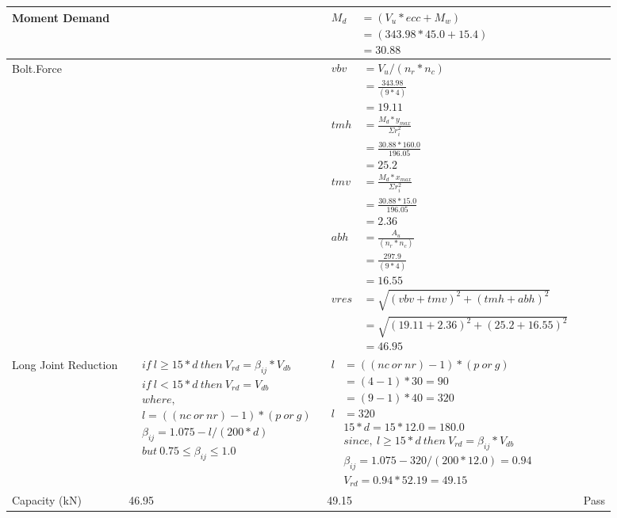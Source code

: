 \documentclass{article}%
\begin{document}
\begin{longtable}{|p{4cm}|p{5cm}|p{6.5cm}|p{1.5cm}|}
\hline%
Moment Demand&&$\begin{aligned}  M_d~~ &= (V_u * ecc + M_w)\\  &= (343.98 * 45.0 + 15.4)\\  & =30.88\end{aligned}$&\\%
\hline%
Bolt.Force&&$\begin{aligned} vbv~~ &= V_u / (n_r * n_c)\\  &= \frac{343.98}{ (9*4)}\\  & =19.11\\ tmh~ &= \frac{M_d * y_{max} }{ \Sigma r_i^2} \\  &= \frac{30.88 *160.0}{196.05}\\  & =25.2\\  tmv ~&= \frac{M_d * x_{max}}{\Sigma r_i^2}\\ &= \frac{30.88 * 15.0}{196.05}\\  & =2.36\\  abh~ & = \frac{A_u }{(n_r * n_c)}\\   & =\frac{297.9}{ (9 *4)}\\  & =16.55\\  vres &=\sqrt{(vbv +tmv) ^ 2 + (tmh+abh) ^ 2}\\   &= \sqrt{(19.11 +2.36) ^2 + (25.2+16.55) ^ 2}\\  & =46.95\end{aligned}$&\\%
\hline%
Long Joint Reduction&$\begin{aligned} &if~l\geq 15 * d~then~V_{rd} = \beta_{ij} * V_{db} \\ & if~l < 15 * d~then~V_{rd} = V_{db} \\ & where,\\ & l = ((nc~or~nr) - 1) * (p~or~g) \\ & \beta_{ij} = 1.075 - l/(200 * d) \\ & but~0.75\leq\beta_{ij}\leq1.0 \end{aligned}$&$\begin{aligned} l&= ((nc~or~nr) - 1) * (p~or~g) \\  &= (4 - 1) * 30=90\\  &= (9 - 1) * 40=320\\  l&= 320\\ & 15 * d = 15 * 12.0 = 180.0 \\ & since,~l \geq 15 * d~then~V_{rd} = \beta_{ij} * V_{db} \\ & \beta_{ij} = 1.075 - 320/(200*12.0) =0.94\\ & V_{rd} = 0.94 * 52.19=49.15 \end{aligned}$&\\%
\hline%
Capacity (kN)&46.95&49.15&Pass\\%
\hline%
\end{longtable}
\end{document}
